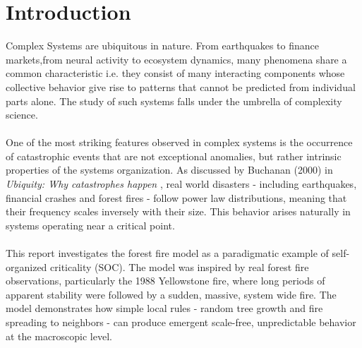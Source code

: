 \documentclass{article}
\begin{document}
\section{Introduction}
Complex Systems are ubiquitous in nature. From earthquakes to finance markets,from neural activity to ecosystem dynamics, many phenomena share a common characteristic i.e. they consist of many interacting components whose collective behavior give rise to patterns that cannot be predicted from individual parts alone. The study of such systems falls under the umbrella of complexity science.\\
\\
One of the most striking features observed in complex systems is the occurrence of catastrophic events that are not exceptional anomalies, but rather intrinsic properties of the systems organization. As discussed by Buchanan (2000) in \textit{Ubiquity: Why catastrophes happen} ,  real world disasters - including earthquakes, financial crashes and forest fires - follow power law distributions, meaning that their frequency scales inversely with their size. This behavior arises naturally in systems operating near a critical point.\\
\\
This report investigates the forest fire model as a paradigmatic example of self-organized criticality (SOC). The model was inspired by real forest fire observations, particularly the 1988 Yellowstone fire, where long periods of apparent stability were followed by a sudden, massive, system wide fire. The model demonstrates how simple local rules - random tree growth and fire spreading to neighbors - can produce emergent scale-free, unpredictable behavior at the macroscopic level.\\
\\
\end{document}
